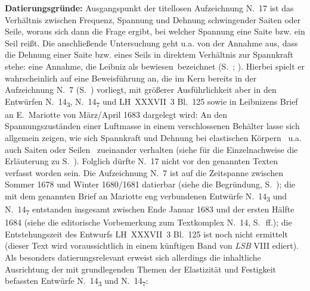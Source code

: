 \begin{ledgroup}
{%
\textbf{Datierungsgründe:}\label{LH_35_09_15_018-019_Datierung}
Ausgangspunkt der titellosen Aufzeichnung N.~17 ist das Verhältnis zwischen Frequenz, Spannung und Dehnung schwingender Saiten oder Seile,
woraus sich dann die Frage ergibt, bei welcher Spannung eine Saite bzw. ein Seil reißt.
Die anschließende Untersuchung geht u.a. von der Annah\-me aus, dass die Dehnung einer Saite bzw. eines Seils in direktem Verhältnis zur Spannkraft stehe: eine Annahme, die Leibniz als \glqq bewiesen\grqq\ bezeichnet (S.~; ).
Hierbei spielt er wahrscheinlich auf eine Beweisführung an, die im Kern bereits in der Aufzeichnung N.~7 (S.~) vorliegt, mit größerer Ausführlichkeit aber in den Entwürfen N.~14\textsubscript{3}, N.~14\textsubscript{7} und LH~XXXVII~3 Bl.~125 sowie in Leibnizens Brief an E.~Mariotte von März/April 1683 dargelegt wird:
An den Spannungszuständen einer Luftmasse in einem verschlossenen Behälter lasse sich allgemein zeigen, wie sich Spannkraft und Dehnung bei elastischen Körpern \textendash\ u.a. auch Saiten oder Seilen \textendash\ zueinander verhalten
(siehe für die Einzelnachweise die Erläuterung zu S.~).%
\protect{}
Folglich dürfte N.~17 nicht vor den genannten Texten verfasst worden sein.
Die Aufzeichnung N.~7 ist auf die Zeitspanne zwischen Sommer 1678 und Winter 1680/1681 datierbar (siehe die Begründung, S.~\pageref{LH_35_09_15_001,022_Datierung});
die mit dem genannten Brief an Mariotte eng verbundenen Entwürfe N.~14\textsubscript{3} und N.~14\textsubscript{7} entstanden insgesamt zwischen Ende Januar 1683 und der ersten Hälfte 1684 (siehe die editorische Vorbemerkung zum Textkomplex N.~14, S.~\,ff.);\protect{}
die Entstehungszeit des Entwurfs LH~XXXVII~3 Bl.~125 ist noch nicht ermittelt (dieser Text wird voraussichtlich in einem künftigen Band von \textit{LSB} VIII ediert). 
Als besonders datierungsrelevant erweist sich allerdings die inhaltliche Aus\-richtung der mit grundlegenden Themen der Elastizität und Festigkeit befassten Entwürfe N.~14\textsubscript{3} und N.~14\textsubscript{7}:
}
\end{ledgroup}
